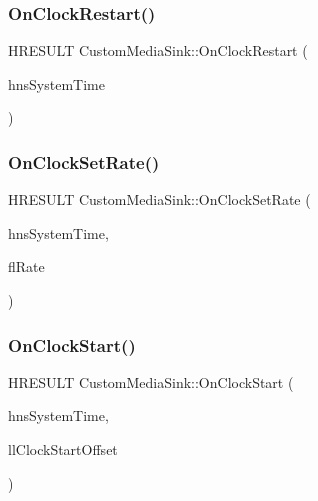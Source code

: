 \subsubsection{\texorpdfstring{On\+Clock\+Restart()}{OnClockRestart()}}
{\footnotesize\ttfamily H\+R\+E\+S\+U\+LT Custom\+Media\+Sink\+::\+On\+Clock\+Restart (\begin{DoxyParamCaption}\item[{M\+F\+T\+I\+ME}]{hns\+System\+Time }\end{DoxyParamCaption})\hspace{0.3cm}{\ttfamily [override]}}

\mbox{\label{class_custom_media_sink_a25f16e92bd5f490f49f5cb9cf5d566e3}} 
\subsubsection{\texorpdfstring{On\+Clock\+Set\+Rate()}{OnClockSetRate()}}
{\footnotesize\ttfamily H\+R\+E\+S\+U\+LT Custom\+Media\+Sink\+::\+On\+Clock\+Set\+Rate (\begin{DoxyParamCaption}\item[{M\+F\+T\+I\+ME}]{hns\+System\+Time,  }\item[{float}]{fl\+Rate }\end{DoxyParamCaption})\hspace{0.3cm}{\ttfamily [override]}}

\mbox{\label{class_custom_media_sink_a56227be87e465484d3fa76f4411bff72}} 
\subsubsection{\texorpdfstring{On\+Clock\+Start()}{OnClockStart()}}
{\footnotesize\ttfamily H\+R\+E\+S\+U\+LT Custom\+Media\+Sink\+::\+On\+Clock\+Start (\begin{DoxyParamCaption}\item[{M\+F\+T\+I\+ME}]{hns\+System\+Time,  }\item[{L\+O\+N\+G\+L\+O\+NG}]{ll\+Clock\+Start\+Offset }\end{DoxyParamCaption})\hspace{0.3cm}{\ttfamily [override]}}

